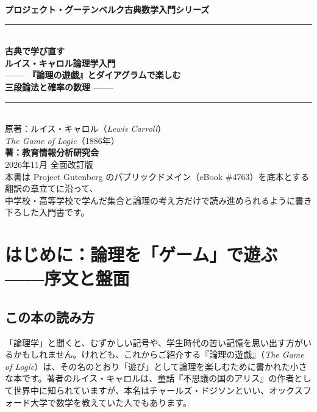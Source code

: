 \documentclass[a4paper,11pt,openany]{ltjsbook}
\begin{document}
\begin{titlepage}
\begin{center}
\vspace*{1.5cm}
{\Large\bfseries プロジェクト・グーテンベルク古典数学入門シリーズ}\\[0.8cm]
\rule{\textwidth}{1.5pt}\\[0.4cm]
{\Huge\bfseries 古典で学び直す\\ルイス・キャロル論理学入門}\\[0.4cm]
{\Large\bfseries —— 『論理の遊戯』とダイアグラムで楽しむ\\三段論法と確率の数理 ——}\\[0.4cm]
\rule{\textwidth}{1.5pt}\\[1.5cm]
{\large 原著：ルイス・キャロル（\textit{Lewis Carroll}）\\
\textit{The Game of Logic}（1886年）}\\[2.0cm]
{\Large\bfseries 著：教育情報分析研究会}\\[2.5cm]
\vfill
{\large 2026年11月 全面改訂版}\\[0.5cm]
{\footnotesize 本書は Project Gutenberg のパブリックドメイン（eBook \#4763）を底本とする翻訳の章立てに沿って、\\
中学校・高等学校で学んだ集合と論理の考え方だけで読み進められるように書き下ろした入門書です。}
\end{center}
\end{titlepage}

\frontmatter
\tableofcontents

\mainmatter

\chapter*{はじめに：論理を「ゲーム」で遊ぶ ——序文と盤面}

\section*{この本の読み方}

「論理学」と聞くと、むずかしい記号や、学生時代の苦い記憶を思い出す方がいるかもしれません。けれども、これからご紹介する『論理の遊戯』（\textit{The Game of Logic}）は、その名のとおり「遊び」として論理を楽しむために書かれた小さな本です。著者のルイス・キャロルは、童話『不思議の国のアリス』の作者として世界中に知られていますが、本名はチャールズ・ドジソンといい、オックスフォード大学で数学を教えていた人でもあります。
\end{document}
